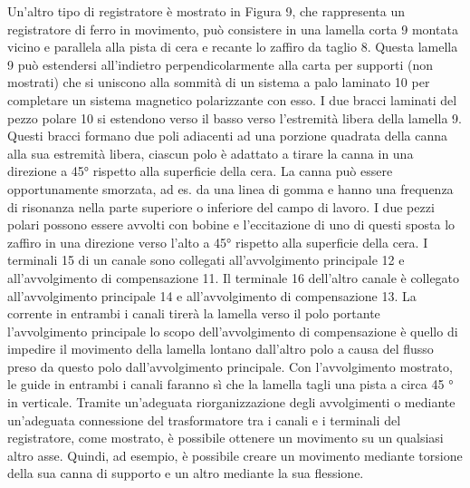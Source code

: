 \documentclass[11pt]{article}
\begin{document}
\begin{multicols*}{2}
Un’altro tipo di registratore è mostrato in Figura 9, che rappresenta un registratore di ferro in movimento, può consistere in una lamella corta 9 montata vicino e parallela alla pista di cera e recante lo zaffiro da taglio 8. Questa lamella 9 può estendersi all'indietro perpendicolarmente alla carta per supporti (non mostrati) che si uniscono alla sommità di un sistema a palo laminato 10 per completare un sistema magnetico polarizzante con esso. I due bracci laminati del pezzo polare 10 si estendono verso il basso verso l'estremità libera della lamella 9. Questi bracci formano due poli adiacenti ad una porzione quadrata della canna alla sua estremità libera, ciascun polo è adattato a tirare la canna in una direzione a 45° rispetto alla superficie della cera. La canna può essere opportunamente smorzata, ad es. da una linea di gomma e hanno una frequenza di risonanza nella parte superiore o inferiore del campo di lavoro. I due pezzi polari possono essere avvolti con bobine e l'eccitazione di uno di questi sposta lo zaffiro in una direzione verso l'alto a 45° rispetto alla superficie della cera. I terminali 15 di un canale sono collegati all'avvolgimento principale 12 e all'avvolgimento di compensazione 11. Il terminale 16 dell'altro canale è collegato all'avvolgimento principale 14 e all'avvolgimento di compensazione 13. La corrente in entrambi i canali tirerà la lamella verso il polo portante l'avvolgimento principale lo scopo dell'avvolgimento di compensazione è quello di impedire il movimento della lamella lontano dall'altro polo a causa del flusso preso da questo polo dall'avvolgimento principale. Con l'avvolgimento mostrato, le guide in entrambi i canali faranno sì che la lamella tagli una pista a circa 45 ° in verticale. Tramite un'adeguata riorganizzazione degli avvolgimenti o mediante un'adeguata connessione del trasformatore tra i canali e i terminali del registratore, come mostrato, è possibile ottenere un movimento su un qualsiasi altro asse. Quindi, ad esempio, è possibile creare un movimento mediante torsione della sua canna di supporto e un altro mediante la sua flessione.


\end{multicols*}
\end{document}
